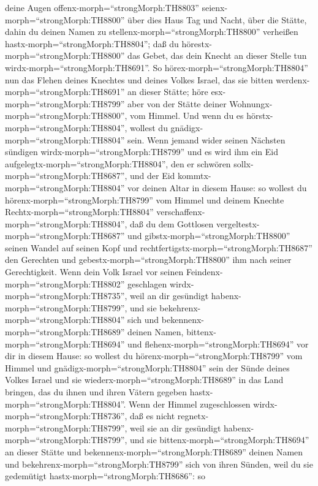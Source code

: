 deine Augen offenx-morph=``strongMorph:TH8803''
seienx-morph=``strongMorph:TH8800'' über dies Haus Tag und Nacht, über
die Stätte, dahin du deinen Namen zu
stellenx-morph=``strongMorph:TH8800'' verheißen
hastx-morph=``strongMorph:TH8804''; daß du
hörestx-morph=``strongMorph:TH8800'' das Gebet, das dein Knecht an
dieser Stelle tun wirdx-morph=``strongMorph:TH8691''.  So
hörex-morph=``strongMorph:TH8804'' nun das Flehen deines Knechtes und
deines Volkes Israel, das sie bitten
werdenx-morph=``strongMorph:TH8691'' an dieser Stätte; höre
esx-morph=``strongMorph:TH8799'' aber von der Stätte deiner
Wohnungx-morph=``strongMorph:TH8800'', vom Himmel. Und wenn du es
hörstx-morph=``strongMorph:TH8804'', wollest du
gnädigx-morph=``strongMorph:TH8804'' sein.  Wenn jemand
wider seinen Nächsten sündigen wirdx-morph=``strongMorph:TH8799'' und es
wird ihm ein Eid aufgelegtx-morph=``strongMorph:TH8804'', den er
schwören sollx-morph=``strongMorph:TH8687'', und der Eid
kommtx-morph=``strongMorph:TH8804'' vor deinen Altar in diesem Hause:
 so wollest du hörenx-morph=``strongMorph:TH8799'' vom
Himmel und deinem Knechte Rechtx-morph=``strongMorph:TH8804''
verschaffenx-morph=``strongMorph:TH8804'', daß du dem Gottlosen
vergeltestx-morph=``strongMorph:TH8687'' und
gibstx-morph=``strongMorph:TH8800'' seinen Wandel auf seinen Kopf und
rechtfertigstx-morph=``strongMorph:TH8687'' den Gerechten und
gebestx-morph=``strongMorph:TH8800'' ihm nach seiner Gerechtigkeit.
 Wenn dein Volk Israel vor seinen
Feindenx-morph=``strongMorph:TH8802'' geschlagen
wirdx-morph=``strongMorph:TH8735'', weil an dir gesündigt
habenx-morph=``strongMorph:TH8799'', und sie
bekehrenx-morph=``strongMorph:TH8804'' sich und
bekennenx-morph=``strongMorph:TH8689'' deinen Namen,
bittenx-morph=``strongMorph:TH8694'' und
flehenx-morph=``strongMorph:TH8694'' vor dir in diesem Hause:
 so wollest du hörenx-morph=``strongMorph:TH8799'' vom
Himmel und gnädigx-morph=``strongMorph:TH8804'' sein der Sünde deines
Volkes Israel und sie wiederx-morph=``strongMorph:TH8689'' in das Land
bringen, das du ihnen und ihren Vätern gegeben
hastx-morph=``strongMorph:TH8804''.  Wenn der Himmel
zugeschlossen wirdx-morph=``strongMorph:TH8736'', daß es nicht
regnetx-morph=``strongMorph:TH8799'', weil sie an dir gesündigt
habenx-morph=``strongMorph:TH8799'', und sie
bittenx-morph=``strongMorph:TH8694'' an dieser Stätte und
bekennenx-morph=``strongMorph:TH8689'' deinen Namen und
bekehrenx-morph=``strongMorph:TH8799'' sich von ihren Sünden, weil du
sie gedemütigt hastx-morph=``strongMorph:TH8686'':  so
